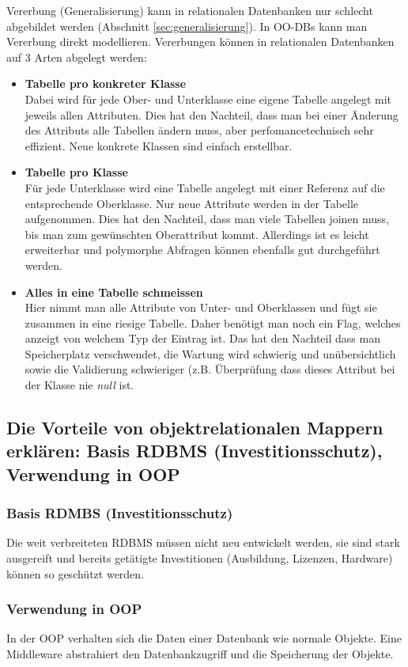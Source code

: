 Vererbung (Generalisierung) kann in relationalen Datenbanken nur schlecht abgebildet werden (Abschnitt \ref{sec:generalisierung}). In OO-DBs kann man Vererbung direkt modellieren.
Vererbungen können in relationalen Datenbanken auf 3 Arten abgelegt werden:
\begin{itemize}
  \item \textbf{Tabelle pro konkreter Klasse} \\
  Dabei wird für jede Ober- und Unterklasse eine eigene Tabelle angelegt mit jeweils allen Attributen. Dies hat den Nachteil, dass man bei einer Änderung des Attributs alle Tabellen ändern muss, aber perfomancetechnisch sehr effizient. Neue konkrete Klassen sind einfach erstellbar.
  \item \textbf{Tabelle pro Klasse} \\
  Für jede Unterklasse wird eine Tabelle angelegt mit einer Referenz auf die entsprechende Oberklasse. Nur neue Attribute werden in der Tabelle aufgenommen. Dies hat den Nachteil, dass man viele Tabellen joinen muss, bis man zum gewünschten Oberattribut kommt. Allerdings ist es leicht erweiterbar und polymorphe Abfragen können ebenfalls gut durchgeführt werden.
  \item \textbf{Alles in eine Tabelle schmeissen} \\
  Hier nimmt man alle Attribute von Unter- und Oberklassen und fügt sie zusammen in eine riesige Tabelle. Daher benötigt man noch ein Flag, welches anzeigt von welchem Typ der Eintrag ist. Das hat den Nachteil dass man Speicherplatz verschwendet, die Wartung wird schwierig und unübersichtlich sowie die Validierung schwieriger (z.B. Überprüfung dass dieses Attribut bei der Klasse nie \emph{null} ist.
\end{itemize}

\subsection{Die Vorteile von objektrelationalen Mappern erklären: Basis RDBMS (Investitionsschutz), Verwendung in OOP}

\subsubsection{Basis RDMBS (Investitionsschutz)}
Die weit verbreiteten RDBMS müssen nicht neu entwickelt werden, sie sind stark ausgereift und bereits getätigte Investitionen (Ausbildung, Lizenzen, Hardware) können so geschützt werden.

\subsubsection{Verwendung in OOP}
In der OOP verhalten sich die Daten einer Datenbank wie normale Objekte. Eine Middleware abstrahiert den Datenbankzugriff und die Speicherung der Objekte.


